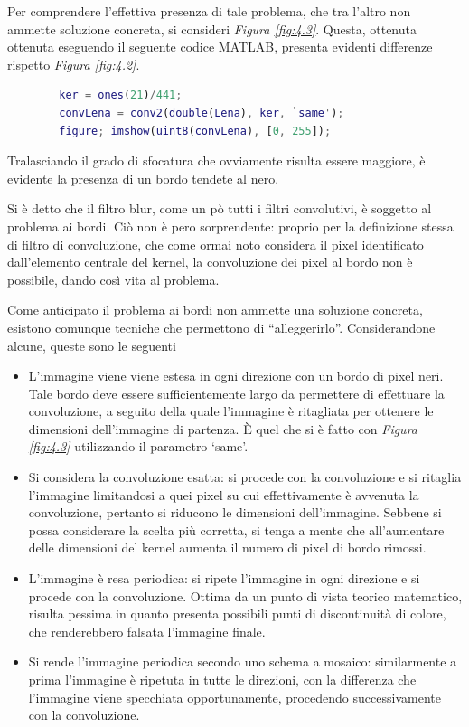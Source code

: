 \documentclass{subfiles}
\begin{document}
Per comprendere l'effettiva presenza di tale problema, che tra l'altro non ammette soluzione concreta, si consideri \emph{Figura \ref{fig:4.3}}.
Questa, ottenuta ottenuta eseguendo il seguente codice MATLAB, presenta evidenti differenze rispetto \emph{Figura \ref{fig:4.2}}.
\begin{center}
    \begin{lstlisting}[language = MATLAB]
        % si aggiunge l'immagine trascinandola in MATLAB
        ker = ones(21)/441;
        convLena = conv2(double(Lena), ker, `same');
        figure; imshow(uint8(convLena), [0, 255]);
    \end{lstlisting}
\end{center}
Tralasciando il grado di sfocatura che ovviamente risulta essere maggiore, è evidente la presenza di un bordo tendete al nero.

Si è detto che il filtro blur, come un pò tutti i filtri convolutivi, è soggetto al problema ai bordi.
Ciò non è pero sorprendente: proprio per la definizione stessa di filtro di convoluzione, che come ormai noto considera il pixel identificato dall'elemento centrale del kernel,
la convoluzione dei pixel al bordo non è possibile, dando così vita al problema.

Come anticipato il problema ai bordi non ammette una soluzione concreta, esistono comunque tecniche che permettono di ``alleggerirlo''.
Considerandone alcune, queste sono le seguenti
\begin{itemize}
    \item L'immagine viene viene estesa in ogni direzione con un bordo di pixel neri. Tale bordo deve essere sufficientemente largo da permettere di effettuare la convoluzione,
          a seguito della quale l'immagine è ritagliata per ottenere le dimensioni dell'immagine di partenza.
          \`E quel che si è fatto con \emph{Figura \ref{fig:4.3}} utilizzando il parametro `same'.

    \item Si considera la convoluzione esatta: si procede con la convoluzione e si ritaglia l'immagine limitandosi a quei pixel su cui effettivamente è avvenuta la convoluzione,
          pertanto si riducono le dimensioni dell'immagine. Sebbene si possa considerare la scelta più corretta,
          si tenga a mente che all'aumentare delle dimensioni del kernel aumenta il numero di pixel di bordo rimossi.

    \item L'immagine è resa periodica: si ripete l'immagine in ogni direzione e si procede con la convoluzione.
          Ottima da un punto di vista teorico matematico, risulta pessima in quanto presenta possibili punti di discontinuità di colore,
          che renderebbero falsata l'immagine finale.

    \item Si rende l'immagine periodica secondo uno schema a mosaico: similarmente a prima l'immagine è ripetuta in tutte le direzioni,
          con la differenza che l'immagine viene specchiata opportunamente, procedendo successivamente con la convoluzione.
\end{itemize}
\end{document}
